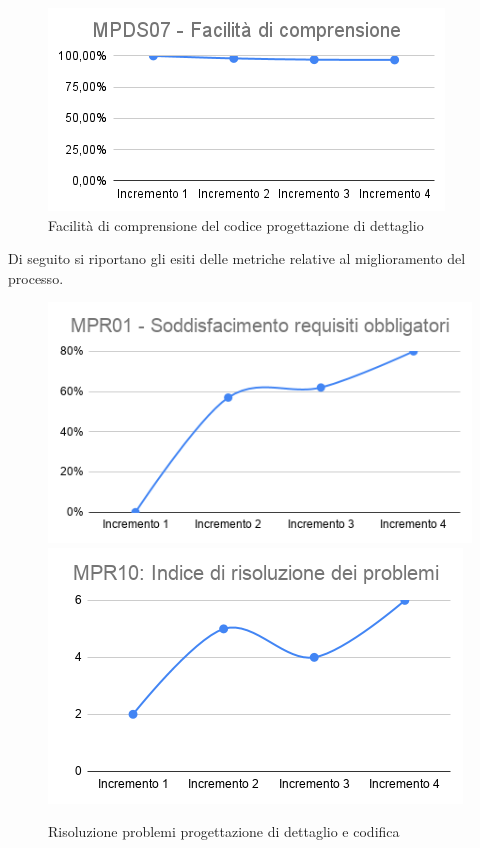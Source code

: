 \begin{figure}[h!]
	\centering
	\includegraphics[scale=0.6]{Immagini/MPDS07_FComprensione.png}
	\caption{Facilità di comprensione del codice progettazione di dettaglio}
	\label{fig:FacilitàCodice}
\end{figure}

Di seguito si riportano gli esiti delle metriche relative al miglioramento del processo.
\begin{figure}[h!]
	\includegraphics[scale=0.58]{Immagini/MPR01_RObbligatori.png}\quad
	\includegraphics[scale=0.58]{Immagini/MPR10_rproblemidettaglio.png}
	\caption{Risoluzione problemi progettazione di dettaglio e codifica}
	\label{fig:MPR10codifica}
\end{figure}

